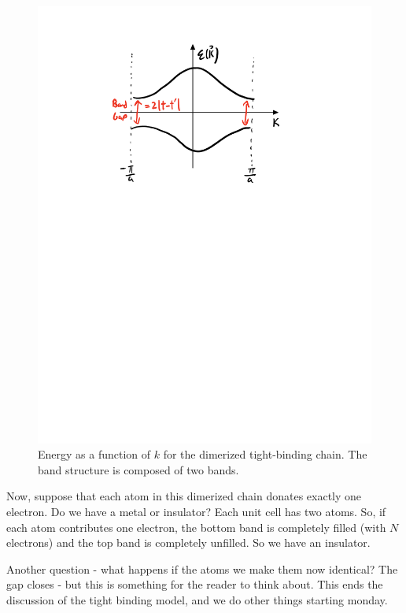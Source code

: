 \begin{figure}[htbp]
    \centering
    \includegraphics[scale=0.6]{Images/fig-dimerizedchainenergy.pdf}
    
    \caption{Energy as a function of $k$ for the dimerized tight-binding chain. The band structure is composed of two bands.}
    \label{fig-dimerizedchainenergy}
\end{figure}

Now, suppose that each atom in this dimerized chain donates exactly one electron. Do we have a metal or insulator? Each unit cell has two atoms. So, if each atom contributes one electron, the bottom band is completely filled (with $N$ electrons) and the top band is completely unfilled. So we have an insulator.

Another question - what happens if the atoms we make them now identical? The gap closes - but this is something for the reader to think about. This ends the discussion of the tight binding model, and we do other things starting monday.